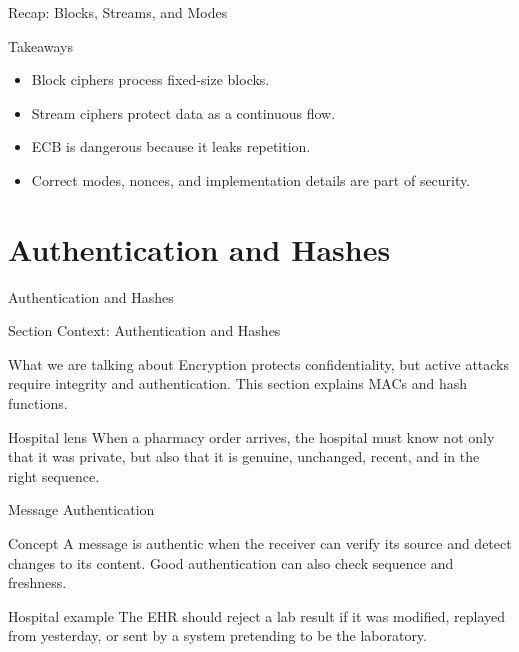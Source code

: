 \documentclass[presentation]{beamer}
\newcommand{\sectiontitleframe}[1]{
\begin{frame}[plain,c]
\begin{center}
{\usebeamerfont{title}\usebeamercolor[fg]{title}#1}
\end{center}
\end{frame}
}
\begin{document}
\begin{frame}[c]{Recap: Blocks, Streams, and Modes}
\begin{block}{Takeaways}
\begin{itemize}
    \item Block ciphers process fixed-size blocks.
    \item Stream ciphers protect data as a continuous flow.
    \item ECB is dangerous because it leaks repetition.
    \item Correct modes, nonces, and implementation details are part of security.
\end{itemize}
\end{block}
\end{frame}

\section{Authentication and Hashes}
\sectiontitleframe{Authentication and Hashes}

\begin{frame}[c]{Section Context: Authentication and Hashes}
\begin{block}{What we are talking about}
Encryption protects confidentiality, but active attacks require integrity and authentication.
This section explains MACs and hash functions.
\end{block}

\begin{exampleblock}{Hospital lens}
When a pharmacy order arrives, the hospital must know not only that it was private, but also that
it is genuine, unchanged, recent, and in the right sequence.
\end{exampleblock}
\end{frame}

\begin{frame}[c]{Message Authentication}
\begin{block}{Concept}
A message is authentic when the receiver can verify its source and detect changes to its content.
Good authentication can also check sequence and freshness.
\end{block}

\begin{exampleblock}{Hospital example}
The EHR should reject a lab result if it was modified, replayed from yesterday, or sent by a system
pretending to be the laboratory.
\end{exampleblock}
\end{frame}
\end{document}
